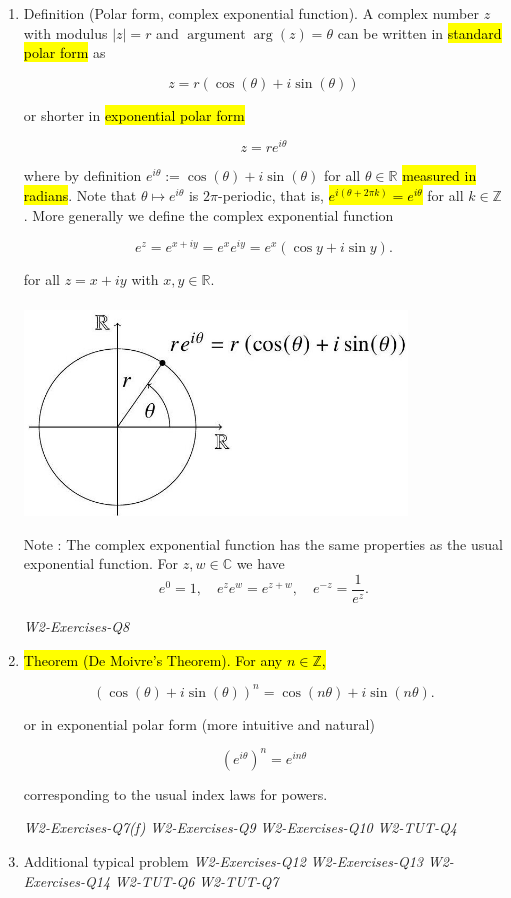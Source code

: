 \documentclass[10pt]{article}
\begin{document}
\begin{enumerate}
\item Definition (Polar form, complex exponential function). A complex number $z$ with modulus $|z|=r$ and $\operatorname{argument} \arg (z)=\theta$ can be written in \hl{standard polar form} as

$$
z=r(\cos (\theta)+i \sin (\theta))
$$

or shorter in \hl{exponential polar form}

$$
z=r e^{i \theta}
$$

where by definition $e^{i \theta}:=\cos (\theta)+i \sin (\theta)$ for all $\theta \in \mathbb{R}$ \hl{measured in radians}. Note that $\theta \mapsto e^{i \theta}$ is $2 \pi$-periodic, that is, \hl{$e^{i(\theta+2 \pi k)}=e^{i \theta}$} for all $k \in \mathbb{Z}$. More generally we define the complex exponential function

$$
e^{z}=e^{x+i y}=e^{x} e^{i y}=e^{x}(\cos y+i \sin y) .
$$

for all $z=x+i y$ with $x, y \in \mathbb{R}$.
\\\\
\includegraphics[width=0.8\textwidth]{images/W2-1.jpg}


Note : The complex exponential function has the same properties as the usual exponential function. For $z, w \in \mathbb{C}$ we have\\


$$
e^{0}=1, \quad e^{z} e^{w}=e^{z+w}, \quad e^{-z}=\frac{1}{e^{z}} .
$$

\textit{W2-Exercises-Q8}


\newpage

\item \hl{Theorem (De Moivre's Theorem). For any $n \in \mathbb{Z}$,}


$$
(\cos (\theta)+i \sin (\theta))^{n}=\cos (n \theta)+i \sin (n \theta) .
$$



or in exponential polar form (more intuitive and natural)

$$
\left(e^{i \theta}\right)^{n}=e^{i n \theta}
$$

corresponding to the usual index laws for powers.

\textit{W2-Exercises-Q7(f)}
\textit{W2-Exercises-Q9}
\textit{W2-Exercises-Q10}
\textit{W2-TUT-Q4}


\item Additional typical problem
\textit{W2-Exercises-Q12}
\textit{W2-Exercises-Q13}
\textit{W2-Exercises-Q14}
\textit{W2-TUT-Q6}
\textit{W2-TUT-Q7}
\end{enumerate}
\end{document}

